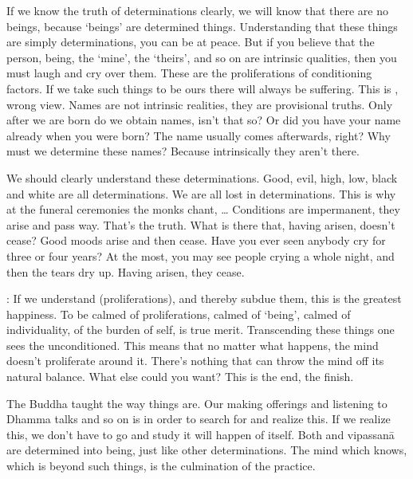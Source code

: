 If we know the truth of determinations clearly, we will know that there are no beings, because `beings' are determined things. Understanding that these things are simply determinations, you can be at peace. But if you believe that the person, being, the `mine', the `theirs', and so on are intrinsic qualities, then you must laugh and cry over them. These are the proliferations of conditioning factors. If we take such things to be ours there will always be suffering. This is , wrong view. Names are not intrinsic realities, they are provisional truths. Only after we are born do we obtain names, isn't that so? Or did you have your name already when you were born? The name usually comes afterwards, right? Why must we determine these names? Because intrinsically they aren't there.

We should clearly understand these determinations. Good, evil, high, low, black and white are all determinations. We are all lost in determinations. This is why at the funeral ceremonies the monks chant,  \ldots{} Conditions are impermanent, they arise and pass way. That's the truth. What is there that, having arisen, doesn't cease? Good moods arise and then cease. Have you ever seen anybody cry for three or four years? At the most, you may see people crying a whole night, and then the tears dry up. Having arisen, they cease.

: If we understand  (proliferations), and thereby subdue them, this is the greatest happiness. To be calmed of proliferations, calmed of `being', calmed of individuality, of the burden of self, is true merit. Transcending these things one sees the unconditioned. This means that no matter what happens, the mind doesn't proliferate around it. There's nothing that can throw the mind off its natural balance. What else could you want? This is the end, the finish.

The Buddha taught the way things are. Our making offerings and listening to Dhamma talks and so on is in order to search for and realize this. If we realize this, we don't have to go and study  it will happen of itself. Both  and vipassan\=a are determined into being, just like other determinations. The mind which knows, which is beyond such things, is the culmination of the practice.

